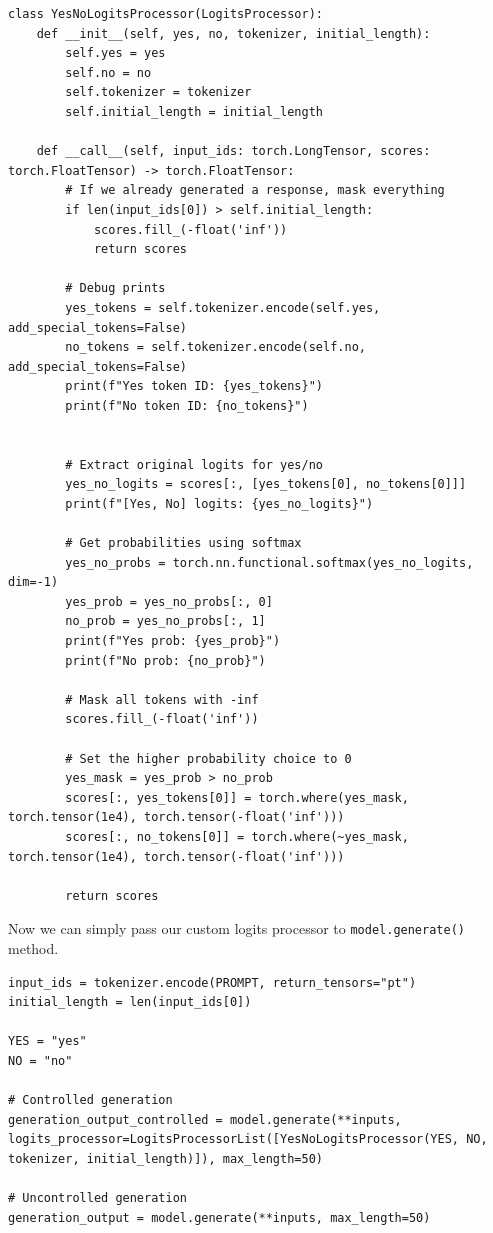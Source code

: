 \begin{verbatim}
class YesNoLogitsProcessor(LogitsProcessor):
    def __init__(self, yes, no, tokenizer, initial_length):
        self.yes = yes
        self.no = no
        self.tokenizer = tokenizer
        self.initial_length = initial_length
        
    def __call__(self, input_ids: torch.LongTensor, scores: torch.FloatTensor) -> torch.FloatTensor:
        # If we already generated a response, mask everything
        if len(input_ids[0]) > self.initial_length:
            scores.fill_(-float('inf'))
            return scores
            
        # Debug prints
        yes_tokens = self.tokenizer.encode(self.yes, add_special_tokens=False)
        no_tokens = self.tokenizer.encode(self.no, add_special_tokens=False)
        print(f"Yes token ID: {yes_tokens}")
        print(f"No token ID: {no_tokens}")
        
        
        # Extract original logits for yes/no
        yes_no_logits = scores[:, [yes_tokens[0], no_tokens[0]]]
        print(f"[Yes, No] logits: {yes_no_logits}")
        
        # Get probabilities using softmax
        yes_no_probs = torch.nn.functional.softmax(yes_no_logits, dim=-1)
        yes_prob = yes_no_probs[:, 0]
        no_prob = yes_no_probs[:, 1]
        print(f"Yes prob: {yes_prob}")
        print(f"No prob: {no_prob}")
        
        # Mask all tokens with -inf
        scores.fill_(-float('inf'))
        
        # Set the higher probability choice to 0
        yes_mask = yes_prob > no_prob
        scores[:, yes_tokens[0]] = torch.where(yes_mask, torch.tensor(1e4), torch.tensor(-float('inf')))
        scores[:, no_tokens[0]] = torch.where(~yes_mask, torch.tensor(1e4), torch.tensor(-float('inf')))
        
        return scores
\end{verbatim}

Now we can simply pass our custom logits processor to \texttt{model.generate()} method.

\begin{verbatim}
input_ids = tokenizer.encode(PROMPT, return_tensors="pt")
initial_length = len(input_ids[0])

YES = "yes"
NO = "no"

# Controlled generation
generation_output_controlled = model.generate(**inputs, logits_processor=LogitsProcessorList([YesNoLogitsProcessor(YES, NO, tokenizer, initial_length)]), max_length=50)

# Uncontrolled generation
generation_output = model.generate(**inputs, max_length=50)
\end{verbatim}

